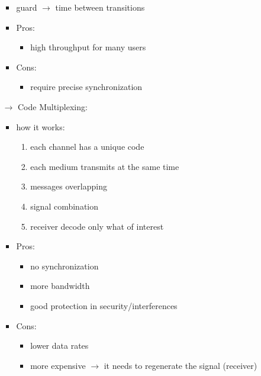 \begin{itemize}
\begin{itemize}
\begin{itemize}
            \item guard $\rightarrow$ time between transitions
            \item Pros:
            \begin{itemize}
                \item high throughput for many users
            \end{itemize}
            \item Cons:
            \begin{itemize}
                \item require precise synchronization
            \end{itemize}
        \end{itemize}
        \item[$\rightarrow$] Code Multiplexing:
        \begin{itemize}
            \item how it works:
            \begin{enumerate}
                \item each channel has a unique code
                \item each medium transmits at the same time
                \item messages overlapping
                \item signal combination
                \item receiver decode only what of interest
            \end{enumerate}
            \item Pros:
            \begin{itemize}
                \item no synchronization
                \item more bandwidth
                \item good protection in security/interferences
            \end{itemize}
            \item Cons:
            \begin{itemize}
                \item lower data rates
                \item more expensive $\rightarrow$ it needs to regenerate the signal (receiver) 
            \end{itemize}
        \end{itemize}
    \end{itemize}
\end{itemize}
\newpage
